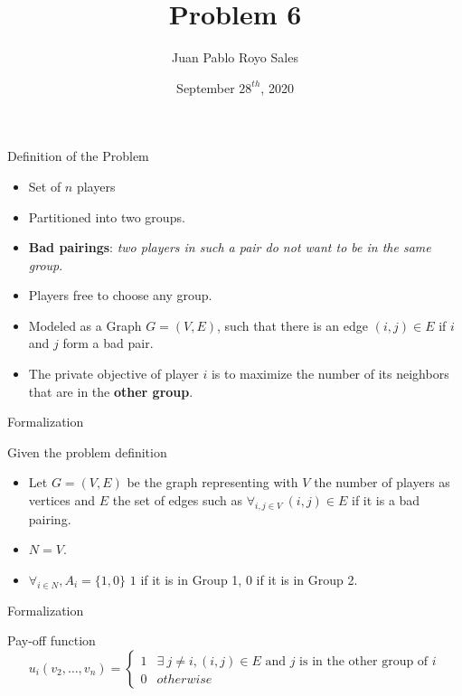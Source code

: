 \documentclass{beamer}
\title{Problem 6}
\author{Juan Pablo Royo Sales}
\institute{Universitat Politècnica de Catalunya}
\date{September $28^{th}$, 2020}
\begin{document}
\begin{frame}
\titlepage
\end{frame}

\begin{frame}[fragile]{Definition of the Problem}

  \begin{block}{}
    \begin{itemize}
      \item Set of $n$ players 
      \item Partitioned into two groups. 
      \item \textbf{Bad pairings}: \textit{two players in such a pair do not want to be in the same group}.
      \item Players free to choose any group.
      \item Modeled as a Graph $G = (V,E)$, such that there is an edge $(i, j) \in E$ if $i$ and $j$ form
      a bad pair.
      \item The private objective of player $i$ is to maximize the number of its neighbors that
      are in the \textbf{other group}.
    \end{itemize}
  \end{block}

\end{frame}


\begin{frame}[fragile]{Formalization}
  \begin{block}{Given the problem definition}
    \begin{itemize}
      \item Let $G=(V,E)$ be the graph representing with $V$ the number of players as vertices and $E$ the set of edges such as $\forall_{i,j \in V}\ (i,j) \in E$ if it is a bad pairing.
      \item $N = V$.
      \item $\forall_{i \in N}, A_i = \{1,0\}$ $1$ if it is in Group 1, $0$ if it is in Group 2.
    \end{itemize}
  \end{block}
\end{frame}

\begin{frame}[fragile]{Formalization}
  \begin{block}{Pay-off function}
    \[
u_i(v_2,\dots,v_n) = 
    \begin{cases}
      1 & \exists\ j \neq i, (i,j) \in E \text{ and $j$ is in the other group of $i$} \\
      0 & otherwise 
    \end{cases} 
\]
  \end{block}
\end{frame}
\end{document}
